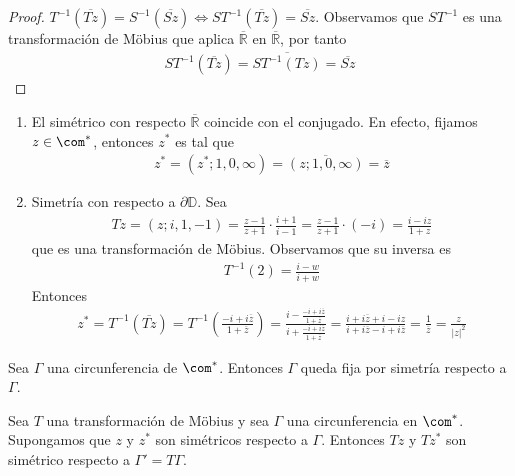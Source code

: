 \begin{proof}
$T^{-1}(\overline{Tz}) = S^{-1}(\overline{Sz}) \Longleftrightarrow ST^{-1}(\overline{Tz}) = \overline{Sz}$. Observamos que $ST^{-1}$ es una transformación de M\"obius que aplica $\overline{\mathbb{R}}$ en $\overline{\mathbb{R}}$, por tanto
\begin{align*}
    ST^{-1}(\overline{Tz}) = \overline{ST^{-1}(Tz)} = \overline{Sz}
\end{align*}
\end{proof}

\begin{ejemplo}
\begin{enumerate}
    \item El simétrico con respecto $\overline{\mathbb{R}}$ coincide con el conjugado. En efecto, fijamos $z \in \com^*$, entonces $z^*$ es tal que
    \begin{align*}
        z^* = (z^*;1,0,\infty) = \overline{(z;1,0,\infty)} = \overline{z}
    \end{align*}
    \item Simetría con respecto a $\partial \mathbb{D}$. Sea
    \begin{align*}
        Tz = (z;i,1,-1) = \frac{z-1}{z+1} \cdot \frac{i+1}{i-1} = \frac{z-1}{z+1} \cdot (-i) = \frac{i - iz}{1 + z}
    \end{align*}
    que es una transformación de M\"obius. Observamos que su inversa es
    \begin{align*}
        T^{-1}(2) = \frac{i- w}{i + w}
    \end{align*}
    Entonces
    \begin{align*}
        z^* = T^{-1}(\overline{Tz}) = T^{-1}\left( \frac{-i + i\overline{z}}{1 + \overline{z}} \right) = \frac{i - \frac{-i + i\overline{z}}{1 + \overline{z}}}{i + \frac{-i + i\overline{z}}{1 + \overline{z}}} = \frac{i + i\overline{z} + i - iz}{i + i\overline{z} -i + i\overline{z}} = \frac{1}{\overline{z}} = \frac{z}{|z|^2}
    \end{align*}
\end{enumerate}
\end{ejemplo}

\begin{prop}
Sea $\Gamma$ una circunferencia de $\com^*$. Entonces $\Gamma$ queda fija por simetría respecto a $\Gamma$.
\end{prop}

\begin{teo}
Sea $T$ una transformación de M\"obius y sea $\Gamma$ una circunferencia en $\com^*$. Supongamos que $z$ y $z^*$ son simétricos respecto a $\Gamma$. Entonces $Tz$ y $Tz^*$ son simétrico respecto a $\Gamma' = T\Gamma$.
\end{teo}

